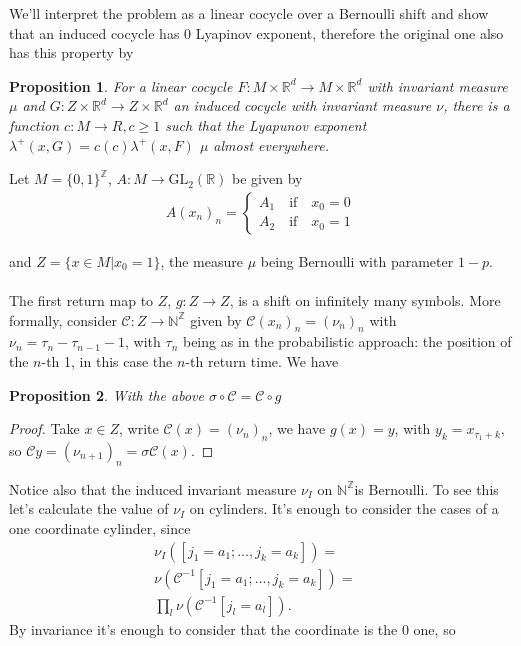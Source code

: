 \documentclass{article}
\newtheorem{proposition}{Proposition}[section]
\begin{document}
We'll interpret the problem as a linear cocycle over a Bernoulli
shift and show that an induced cocycle has 0 Lyapinov exponent,
therefore the original one also has this property by

\begin{proposition}
    For a linear cocycle $F:M\times \mathbb{R}^d\to M\times \mathbb{R}^d$ 
    with invariant measure $\mu$ 
    and $G:Z\times\mathbb{R}^d\to Z\times\mathbb{R}^d$ an induced cocycle with
    invariant measure $\nu$,
    there is a function $c:M\to R, c\geq 1$ such that 
    the Lyapunov exponent $\lambda^+ (x,G)=c(c)\lambda^+(x,F)$ $\mu$
    almost everywhere.
\end{proposition}



Let $M=\{0,1\}^\mathbb{Z}$, $A:M\to \text{GL}_2(\mathbb{R})$
be given by
\begin{align*}
    A(x_n)_n=
    \begin{cases}
        A_1\quad\text{if}\quad x_0=0 \\
        A_2\quad\text{if}\quad x_0=1
    \end{cases}
\end{align*}

and $Z=\{x\in M|x_0=1\}$, the measure $\mu$ being Bernoulli with 
parameter $1-p$.
\paragraph{}

The first return map to $Z$, $g:Z\to Z$, is a shift on infinitely many symbols. 
More formally, consider $\mathcal{C}: Z\to \mathbb{N}^\mathbb{Z}$
given by $\mathcal{C}(x_n)_n=(\nu_n)_n$ with \\ $\nu_n=\tau_n-\tau_{n-1}-1$,
with $\tau_n$ being as in the probabilistic approach: the position
of the $n$-th 1, in this case the $n$-th return time. We have
\begin{proposition}
   With the above $\sigma \circ \mathcal{C}=\mathcal{C}\circ g $
\end{proposition}

\begin{proof}
Take $x\in Z$, write $\mathcal{C}(x)=(\nu_n)_n$, 
we have $g(x)=y$, with $y_k=x_{\tau_1+k}$, so $\mathcal{C}y=(\nu_{n+1})_n=
\sigma \mathcal{C} (x)$.
\end{proof} 

Notice also that the induced invariant measure $\nu_I$ on 
$\mathbb{N}^\mathbb{Z}$is Bernoulli.
To see this let's calculate the value of $\nu_I$ on cylinders.
It's enough to consider the cases of a one coordinate cylinder, 
since
\begin{align*}
\nu_I ([j_1=a_1;\ldots, j_k=a_k])=&\\
\nu (\mathcal{C}^{-1} [j_1=a_1;\ldots, j_k=a_k])=&\\
\prod_{l} \nu (\mathcal{C}^{-1}[j_l=a_l]). 
\end{align*}
By invariance it's enough to consider that the coordinate is the 
0 one, so 
\end{document}
